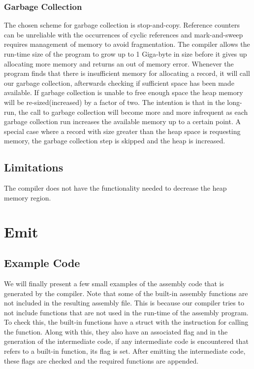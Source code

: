 \documentclass{article}
\begin{document}
\subsubsection{Garbage Collection}
The chosen scheme for garbage collection is stop-and-copy. Reference counters can be unreliable with the occurrences of cyclic references and mark-and-sweep requires management of memory to avoid fragmentation. The compiler allows the run-time size of the program to grow up to 1 Giga-byte in size before it gives up allocating more memory and returns an out of memory error. Whenever the program finds that there is insufficient memory for allocating a record, it will call our garbage collection, afterwards checking if sufficient space has been made available. If garbage collection is unable to free enough space the heap memory will be re-sized(increased)  by a factor of two. The intention is that in the long-run, the call to garbage collection will become more and more infrequent as each garbage collection run increases the available memory up to a certain point. A special case where a record with size greater than the heap space is requesting memory, the garbage collection step is skipped and the heap is increased.

\subsection{Limitations}
The compiler does not have the functionality needed to decrease the heap memory region. 

\section{Emit}

\subsection{Example Code}
We will finally present a few small examples of the assembly code that is generated by the compiler. Note that some of the built-in assembly functions are not included in the resulting assembly file. This is because our compiler tries to not include functions that are not used in the run-time of the assembly program. To check this, the built-in functions have a struct with the instruction for calling the function. Along with this, they also have an associated flag and in the generation of the intermediate code, if any intermediate code is encountered that refers to a built-in function, its flag is set. After emitting the intermediate code, these flags are checked and the required functions are appended.
\end{document}
